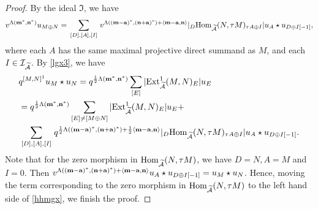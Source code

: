 \documentclass[reqno,12pt]{amsart}
\numberwithin{equation}{section}
\def\Ext{\mbox{\rm Ext}} \def\Hom{\mbox{\rm Hom}} \def\dim{\mbox{\rm dim}} \def\Iso{\mbox{\rm Iso}\,}\def\Ind{\mbox{\rm Ind}\,}
\def\lr#1{\langle #1\rangle} \def\fin{\hfill$\square$}  \def\lra{\longrightarrow} \def\mod{\mbox{\rm \textbf{mod}}\,}\def\Mod{\mbox{\rm mod}\,}\def\top{\mbox{\rm top}\,}\def\soc{\mbox{\rm soc}\,}
\theoremstyle{plain} %
\theoremstyle{definition} %
\begin{document}
\begin{proof}
By the ideal $\mathfrak{I}$, we have
\begin{equation*}
\begin{split}
v^{\Lambda({\bf m}^*,{\bf n}^*)}u_{M\oplus N}=\sum\limits_{\begin{smallmatrix}[D],[A],[I]\end{smallmatrix}}v^{\Lambda(({\bf m}-{{\bf a}})^*,{({\bf n}+{\bf a})}^*)+\lr{{{\bf m}}-{{\bf a}},{\bf n}}}|_D\Hom_{\widetilde{\A}}(N,\tau M)_{\tau A\oplus I}|u_{A}\star u_{D\oplus I[-1]},\end{split}\end{equation*}
where each $A$ has the same maximal projective direct summand as $M$, and each $I\in\mathcal{I}_{\widetilde{\mathcal{A}}}$.
By \eqref{lgx3}, we have
\begin{equation}\label{hhmgx}
\begin{split}
&q^{[M,N]^1}u_M\star u_N=q^{\frac{1}{2}\Lambda({\bf m}^*,{\bf n}^*)}\sum\limits_{[E]}
|\Ext_{\widetilde{\A}}^1(M,N)_E|u_E\\
&=q^{\frac{1}{2}\Lambda({\bf m}^*,{\bf n}^*)}\sum\limits_{[E]\neq [M\oplus N]}
|\Ext_{\widetilde{\A}}^1(M,N)_E|u_E+\\&\sum\limits_{\begin{smallmatrix}[D],[A],[I]\end{smallmatrix}}q^{\frac{1}{2}\Lambda(({\bf m}-{{\bf a}})^*,{({\bf n}+{\bf a})}^*)+\frac{1}{2}\lr{{{\bf m}}-{{\bf a}},{\bf n}}}|_D\Hom_{\widetilde{\A}}(N,\tau M)_{\tau A\oplus I}|u_{A}\star u_{D\oplus I[-1]}.\end{split}\end{equation}
Note that for the zero morphism in $\Hom_{\widetilde{\A}}(N,\tau M)$, we have $D=N, A=M$ and $I=0$.
Then $v^{\Lambda(({\bf m}-{{\bf a}})^*,{({\bf n}+{\bf a})}^*)+\lr{{{\bf m}}-{{\bf a}},{\bf n}}}u_{A}\star u_{D\oplus I[-1]}=u_M\star u_N$.
Hence, moving the term corresponding to the zero morphism in $\Hom_{\widetilde{\A}}(N,\tau M)$ to the left hand side of \eqref{hhmgx}, we finish the proof.
\end{proof}
\end{document}
